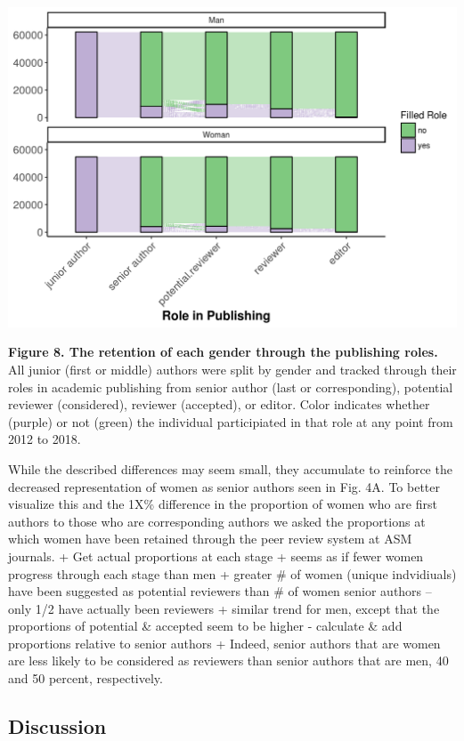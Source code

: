 \documentclass[11pt,]{article}
\begin{document}
\includegraphics{Figure_9.png}

\textbf{Figure 8. The retention of each gender through the publishing
roles.} All junior (first or middle) authors were split by gender and
tracked through their roles in academic publishing from senior author
(last or corresponding), potential reviewer (considered), reviewer
(accepted), or editor. Color indicates whether (purple) or not (green)
the individual participiated in that role at any point from 2012 to
2018.

While the described differences may seem small, they accumulate to
reinforce the decreased representation of women as senior authors seen
in Fig. 4A. To better visualize this and the 1X\% difference in the
proportion of women who are first authors to those who are corresponding
authors we asked the proportions at which women have been retained
through the peer review system at ASM journals. + Get actual proportions
at each stage + seems as if fewer women progress through each stage than
men + greater \# of women (unique indvidiuals) have been suggested as
potential reviewers than \# of women senior authors -- only 1/2 have
actually been reviewers + similar trend for men, except that the
proportions of potential \& accepted seem to be higher - calculate \&
add proportions relative to senior authors + Indeed, senior authors that
are women are less likely to be considered as reviewers than senior
authors that are men, 40 and 50 percent, respectively.

\subsection{Discussion}\label{discussion}
\end{document}
